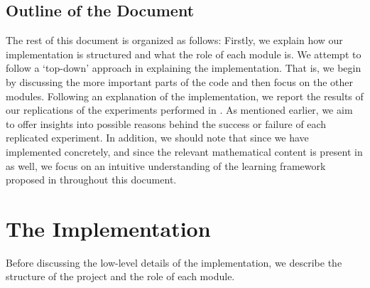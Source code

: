 \documentclass[14pt]{extarticle}
\begin{document}
		\subsection{Outline of the Document}
		The rest of this document is organized as follows: Firstly, we explain how our implementation is structured and what the role of each module is. We attempt to follow a `top-down' approach in explaining the implementation. That is, we begin by discussing the more important parts of the code and then focus on the other modules. Following an explanation of the implementation, we report the results of our replications of the experiments performed in \cite{adda}. As mentioned earlier, we aim to offer insights into possible reasons behind the success or failure of each replicated experiment. In addition, we should note that since we have implemented \cite{adda} concretely, and since the relevant mathematical content is present in \cite{adda} as well, we focus on an intuitive understanding of the learning framework proposed in \cite{adda} throughout this document.
		\pagebreak
		\section{The Implementation}
		Before discussing the low-level details of the implementation, we describe the structure of the project and the role of each module.
\end{document}
